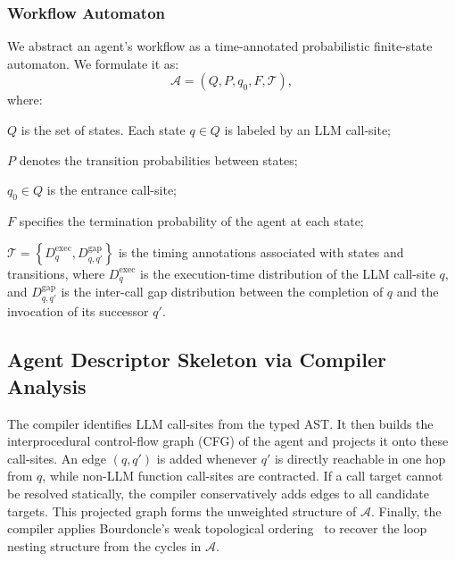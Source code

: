 \subsubsection{Workflow Automaton}
\label{sec:TPFM}
We abstract an agent's workflow as a time-annotated probabilistic finite-state automaton. We formulate it as: 
\[
\mathcal{A} = (Q, P, q_0, F, \mathcal{T}),
\]
where:
\begin{enumerate*}[label=(\roman*)]
    \item $Q$ is the set of states. Each state $q\in Q$ is labeled by an LLM call-site;
    \item $P$ denotes the transition probabilities between states;
    \item $q_0 \in Q$ is the entrance call-site;
    \item $F$ specifies the termination probability of the agent at each state;
    \item $\mathcal{T} = \left\{D^{\mathrm{exec}}_q, D^{\mathrm{gap}}_{q,q'}\right\}$ is the timing annotations associated with states and transitions, where $D^{\mathrm{exec}}_q$ is the execution-time distribution of the LLM call-site $q$, and $D^{\mathrm{gap}}_{q,q'}$ is the inter-call gap distribution between the completion of $q$ and the invocation of its successor $q'$.
\end{enumerate*}


\subsection{Agent Descriptor Skeleton via Compiler Analysis}
\label{sec:analysis}

The compiler identifies LLM call-sites from the typed AST. It then builds the interprocedural control-flow graph (CFG) of the agent and projects it onto these call-sites. An edge $(q, q')$ is added whenever $q'$ is directly reachable in one hop from $q$, while non-LLM function call-sites are contracted. If a call target cannot be resolved statically, the compiler conservatively adds edges to all candidate targets. This projected graph forms the unweighted structure of $\mathcal{A}$. Finally, the compiler applies Bourdoncle's weak topological ordering~\cite{bourdoncle1993efficient} to recover the loop nesting structure from the cycles in $\mathcal{A}$.

